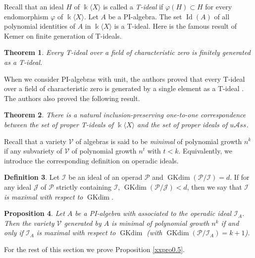 \documentclass{amsart}
\newtheorem{thm}{Theorem}[section]
\newtheorem{prop}[thm]{Proposition}
\theoremstyle{definition}
\newtheorem{Def}[thm]{Definition}
\theoremstyle{remark}
\numberwithin{equation}{section}
\newcommand{\lr}[1]{\langle #1 \rangle}
\def \uas{u\mathcal{A}ss}
\def \I{\mathcal{I}}
\def \ip{{\mathcal{P}}}
\def\gkdim{\operatorname{GKdim}}
\def \Id{\operatorname{Id}}
\begin{document}
Recall that an ideal $H$ of $\Bbbk\langle X \rangle$ is 
called a \textit{T-ideal} if 
$\varphi(H)\subset H$ for every endomorphism $\varphi$ of 
$\Bbbk\langle X \rangle$. Let $A$ be a PI-algebra. The set 
$\Id(A)$ of all polynomial identities of $A$ in 
$\Bbbk\langle X \rangle$ is a T-ideal. Here is the famous
result of Kemer on finite generation of T-ideals.


\begin{thm}
\cite[Theorem 2.4]{Ke}
\label{yythm2.2}
Every T-ideal over a field of characteristic zero is finitely
generated as a T-ideal.
\end{thm}
 
When we consider PI-algebras with unit, the authors proved
that every T-ideal over a field of characteristic zero is 
generated by a single element as a T-ideal 
\cite[Theorem 0.1]{BXYZZ}. The authors also proved the following result.

\begin{thm}
\cite[Theorem 2.9]{BXYZZ} 
\label{yythm2.3}
There is a natural inclusion-preserving one-to-one 
correspondence between the set of proper T-ideals of 
$\Bbbk\lr{X}$ and the set of proper ideals of $\uas$.
\end{thm}


Recall that a variety $\mathcal{V}$ of algebras is said to be 
{\it minimal} of polynomial growth $n^k$ if any subvariety of 
$\mathcal{V}$ of polynomial growth $n^t$ with $t<k$. 
Equivalently, we introduce the corresponding definition on 
operadic ideals.
	
\begin{Def}
\label{yydef2.4}
Let $\I$ be an ideal of an operad $\ip$ and $\gkdim(\ip/\I)=d$.
If for any ideal $\mathcal{J}$ of $\ip$ strictly containing 
$\I$,  $\gkdim(\ip/\mathcal{J})<d$, then we say that $\I$ 
\textit{is maximal with respect to}  $\gkdim$.
\end{Def}
	
\begin{prop}
\label{yypro2.5}
Let $A$ be a PI-algebra with associated to the operadic 
ideal $\I_A$. Then the variety $\mathcal{V}$ generated 
by $A$ is minimal of polynomial growth $n^k$ if and 
only if $\I_A$ is maximal with respect to $\gkdim$
{\rm{(}}with $\gkdim(\ip/\I_A)=k+1${\rm{)}}.
\end{prop}

For the rest of this section we prove Proposition 
\ref{xxpro0.5}.
\end{document}
